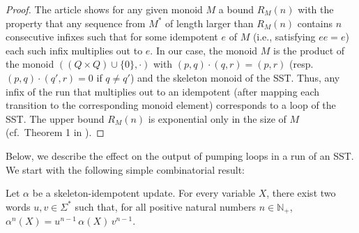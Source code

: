 \documentclass{article}
\begin{document}
\begin{proof}
  The article \cite{JeckerSTACS21} shows for any given monoid $M$ a bound
  $R_M(n)$ with the property that any sequence from $M^*$ of length larger than
  $R_M(n)$ contains $n$ consecutive infixes such that for some idempotent
  $e$ of $M$ (i.e., satisfying $ee =e$) each such infix multiplies out
  to $e$.
  In our case, the monoid $M$ is the product of the 
  monoid $((Q \times Q) \cup \{0\},\cdot)$ with $(p,q)\cdot (q,r)=(p,r)$
  (resp.~$(p,q)\cdot (q',r)=0$ if $q \not= q'$) and the skeleton monoid of the SST.
  Thus, any infix of the run that multiplies out to an idempotent
  (after mapping each transition to the corresponding monoid element)
  corresponds to  a loop of the SST.
  The upper bound $R_M(n)$ is  exponential only in the size of $M$ (cf.~Theorem 1 in \cite{JeckerSTACS21}).
\end{proof}


Below, we describe the effect on the output of pumping 
loops in a run of an SST.
We start with the following simple combinatorial result:


\begin{lemma}\label{lem:loop-pumping}
Let $\alpha$ be a skeleton-idempotent update.
For every variable $X$, there exist two words $u,v \in \Sigma^*$ 
such that, for all positive natural numbers $n \in \mathbb{N}_+$, 
$\alpha^n(X)=u^{n-1} \, \alpha(X) \, v^{n-1}$.
\end{lemma}
\end{document}
